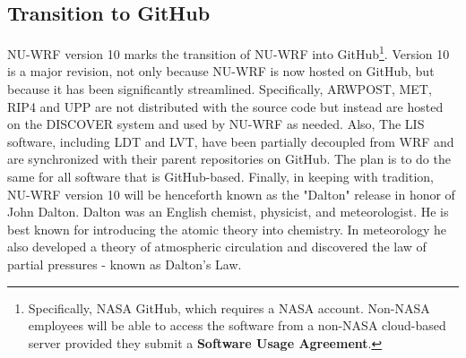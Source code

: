 \subsection{Transition to GitHub}

NU-WRF version 10 marks the transition of NU-WRF into GitHub\footnote{Specifically, NASA GitHub, which requires a NASA account. Non-NASA employees will be able to access the software from a non-NASA cloud-based server provided they submit a \textbf{Software Usage Agreement}.}.  Version 10 is a 
major  revision, not only because NU-WRF is now hosted on GitHub, but because it has been significantly streamlined.  Specifically, ARWPOST, MET, RIP4 and UPP are not distributed with the 
source code but instead are hosted on the DISCOVER system and used by 
NU-WRF as needed. Also, The LIS software, including LDT and LVT, have been partially
decoupled from WRF and are synchronized with their parent repositories on GitHub. 
The plan is to do the same for all software that is GitHub-based. Finally, in keeping with
tradition, NU-WRF version 10 will be henceforth known as the "Dalton" release in honor of John Dalton.  
Dalton was an English chemist, physicist, and meteorologist. He is best known for introducing the atomic theory into chemistry. In meteorology he also developed a theory of atmospheric circulation and discovered the law of partial pressures - known as Dalton's Law.

